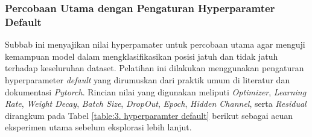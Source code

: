 \subsubsection{Percobaan Utama dengan Pengaturan Hyperparamter Default} \label{III.evaluasi default}
Subbab ini menyajikan nilai hyperpamater untuk percobaan utama agar menguji kemampuan model dalam mengklasifikasikan posisi jatuh dan tidak jatuh terhadap keseluruhan dataset. Pelatihan ini dilakukan menggunakan pengaturan hyperparameter \textit{default} yang dirumuskan dari praktik umum di literatur dan dokumentasi \textit{Pytorch}. Rincian nilai yang digunakan meliputi \textit{Optimizer}, \textit{Learning Rate}, \textit{Weight Decay}, \textit{Batch Size}, \textit{DropOut}, \textit{Epoch}, \textit{Hidden Channel}, serta \textit{Residual} dirangkum pada Tabel \ref{table:3. hyperparamter default} berikut sebagai acuan eksperimen utama sebelum eksplorasi lebih lanjut.

